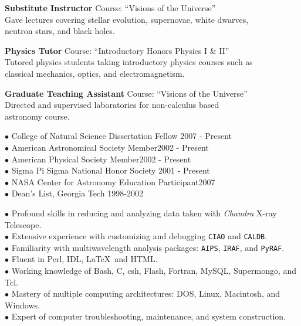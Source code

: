 \documentclass[11pt]{cv}
\begin{document}
\begin{llist}

{\sc \bf{Substitute Instructor}}
Course: ``Visions of the Universe''\\
Gave lectures covering stellar evolution, supernovae, white dwarves,\\
neutron stars, and black holes.

{\sc \bf{Physics Tutor}}
Course: ``Introductory Honors Physics I \& II''\\
Tutored physics students taking introductory physics courses such as\\
classical mechanics, optics, and electromagnetism.

{\sc \bf{Graduate Teaching Assistant}}
Course: ``Visions of the Universe''\\
Directed and supervised laboratories for non-calculus based\\
astronomy course.



$\bullet$ College of Natural Science Dissertation Fellow \hfill 2007 - Present\\
$\bullet$ American Astronomical Society Member\hfill 2002 - Present\\
$\bullet$ American Physical Society Member\hfill 2002 - Present\\
$\bullet$ Sigma Pi Sigma National Honor Society \hfill 2001 - Present\\
$\bullet$ NASA Center for Astronomy Education Participant\hfill 2007\\
$\bullet$ Dean's List, Georgia Tech \hfill 1998-2002


$\bullet$ Profound skills in reducing and analyzing data taken with {\textit{Chandra}} X-ray Telescope.\\
$\bullet$ Extensive experience with customizing and debugging {\tt{CIAO}} and {\tt{CALDB}}.\\
$\bullet$ Familiarity with multiwavelength analysis packages: {\tt{AIPS}}, {\tt{IRAF}}, and {\tt{PyRAF}}.\\
$\bullet$ Fluent in Perl, IDL, \LaTeX\, and HTML.\\
$\bullet$ Working knowledge of Bash, C, csh, Flash, Fortran, MySQL, Supermongo, and Tcl.\\
$\bullet$ Mastery of multiple computing architectures: DOS, Linux, Macintosh, and Windows.\\
$\bullet$ Expert of computer troubleshooting, maintenance, and system construction.


\end{llist}
\end{document}
